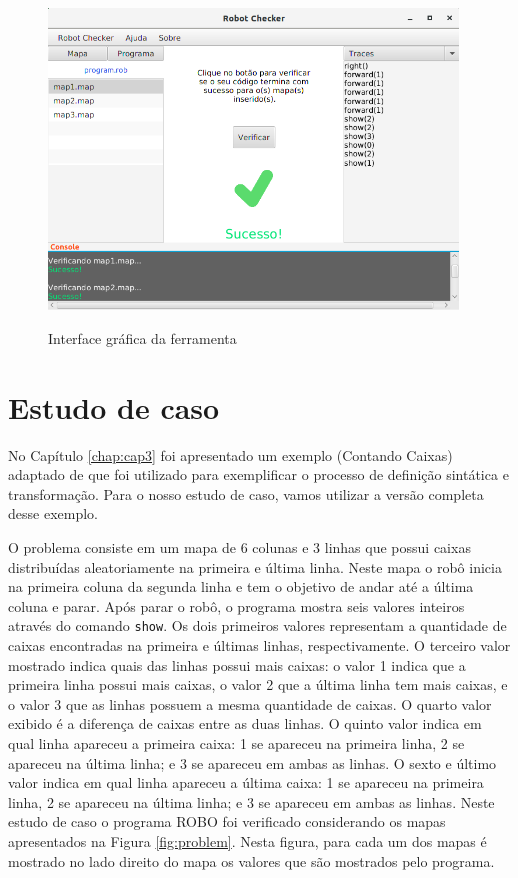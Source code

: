 \begin{figure}[!h]
\centering
\caption{Interface gráfica da ferramenta}
\includegraphics[height=8cm]{figuras/prototipo2.png}
\label{fig:guiprot}
\end{figure}

\section{Estudo de caso}
\label{sec:caso}

No Capítulo \ref{chap:cap3} foi apresentado um exemplo (Contando Caixas) adaptado de \cite{furb} que foi utilizado para exemplificar o processo de definição sintática e transformação. Para o nosso estudo de caso, vamos utilizar a versão completa desse exemplo.

O problema consiste em um mapa de 6 colunas e 3 linhas que possui caixas distribuídas aleatoriamente na primeira e última linha. Neste mapa o robô inicia na primeira coluna da segunda linha e tem o objetivo de andar até a última coluna e parar. Após parar o robô, o programa mostra seis valores inteiros através do comando \texttt{show}. Os dois primeiros valores representam a quantidade de caixas encontradas na primeira e últimas linhas, respectivamente. O terceiro valor mostrado indica quais das linhas possui mais caixas:  o valor 1 indica que a primeira linha possui mais caixas, o valor 2 que a última linha tem mais caixas, e o valor 3  que as linhas possuem a mesma quantidade de caixas. O quarto valor exibido é a diferença de caixas entre as duas linhas. O quinto valor indica em qual linha apareceu a primeira caixa: 1 se apareceu na primeira linha, 2 se apareceu na última linha; e 3 se apareceu em ambas as linhas. O sexto e último valor indica em qual linha apareceu a última caixa: 1 se apareceu na primeira linha, 2 se apareceu na última linha; e 3 se apareceu em ambas as linhas. Neste estudo de caso o programa ROBO foi verificado considerando os mapas apresentados na Figura \ref{fig:problem}. Nesta figura, para cada um dos mapas é mostrado no lado direito do mapa os valores que são mostrados pelo programa.

